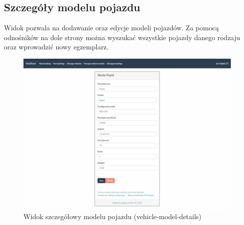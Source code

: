 \documentclass[eng,printmode,openany]{mgr}
\begin{document}
\begin{appendices}
		\newpage
		\section{Szczegóły modelu pojazdu}
		Widok pozwala na dodawanie oraz edycje modeli pojazdów. Za pomocą odnośników na dole strony można wyszukać wszystkie pojazdy danego rodzaju oraz wprowadzić nowy egzemplarz.
		\begin{figure}[H]
			\centering
			\includegraphics[width=\textwidth]{images/views/vehicle-model-detail.png}
			\caption{Widok szczegółowy modelu pojazdu (vehicle-model-details)}
		\end{figure}
	\end{appendices}
\end{document}

